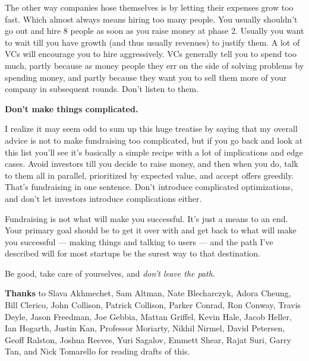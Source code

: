 The other way companies hose themselves is by letting their expenses
grow too fast. Which almost always means hiring too many people. You
usually shouldn't go out and hire 8 people as soon as you raise money at
phase 2. Usually you want to wait till you have growth (and thus usually
revenues) to justify them. A lot of VCs will encourage you to hire
aggressively. VCs generally tell you to spend too much, partly because
as money people they err on the side of solving problems by spending
money, and partly because they want you to sell them more of your
company in subsequent rounds. Don't listen to them.

\textbf{Don't make things complicated.}

I realize it may seem odd to sum up this huge treatise by saying that my
overall advice is not to make fundraising too complicated, but if you go
back and look at this list you'll see it's basically a simple recipe
with a lot of implications and edge cases. Avoid investors till you
decide to raise money, and then when you do, talk to them all in
parallel, prioritized by expected value, and accept offers greedily.
That's fundraising in one sentence. Don't introduce complicated
optimizations, and don't let investors introduce complications either.

Fundraising is not what will make you successful. It's just a means to
an end. Your primary goal should be to get it over with and get back to
what will make you successful --- making things and talking to users ---
and the path I've described will for most startups be the surest way to
that destination.

Be good, take care of yourselves, and \emph{don't leave the path}.


\textbf{Thanks} to Slava Akhmechet, Sam Altman, Nate Blecharczyk, Adora
Cheung, Bill Clerico, John Collison, Patrick Collison, Parker Conrad,
Ron Conway, Travis Deyle, Jason Freedman, Joe Gebbia, Mattan Griffel,
Kevin Hale, Jacob Heller, Ian Hogarth, Justin Kan, Professor Moriarty,
Nikhil Nirmel, David Petersen, Geoff Ralston, Joshua Reeves, Yuri
Sagalov, Emmett Shear, Rajat Suri, Garry Tan, and Nick Tomarello for
reading drafts of this.